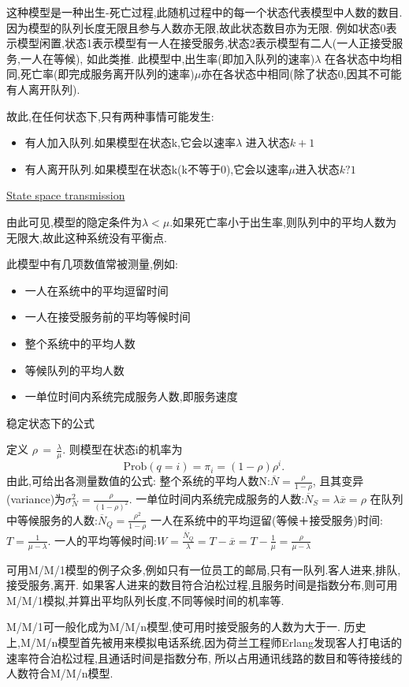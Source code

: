 \documentclass{article}
\begin{document}
这种模型是一种出生-死亡过程,此随机过程中的每一个状态代表模型中人数的数目.因为模型的队列长度无限且参与人数亦无限,故此状态数目亦为无限.
例如状态0表示模型闲置,状态1表示模型有一人在接受服务,状态2表示模型有二人(一人正接受服务,一人在等候),
如此类推. 此模型中,出生率(即加入队列的速率)$\lambda$ 在各状态中均相同,死亡率(即完成服务离开队列的速率)$\mu$亦在各状态中相同(除了状态0,因其不可能有人离开队列).

故此,在任何状态下,只有两种事情可能发生:
\begin{itemize}
\item 有人加入队列.如果模型在状态k,它会以速率$\lambda$ 进入状态$k + 1$
\item 有人离开队列.如果模型在状态k(k不等于0),它会以速率$\mu$进入状态$k ? 1$
\end{itemize}

\href{http://upload.wikimedia.org/wikipedia/commons/thumb/e/e6/MM1\_queue\_state\_space.svg/605px-MM1\_queue\_state\_space.svg.png}{State space transmission}

由此可见,模型的隐定条件为$\lambda < \mu$.如果死亡率小于出生率,则队列中的平均人数为无限大,故此这种系统没有平衡点.

此模型中有几项数值常被测量,例如:
\begin{itemize}
\item 一人在系统中的平均逗留时间
\item 一人在接受服务前的平均等候时间
\item 整个系统中的平均人数
\item 等候队列的平均人数
\item 一单位时间内系统完成服务人数,即服务速度
\end{itemize}

稳定状态下的公式

定义 $\scriptstyle \rho \,=\,{\tfrac  {\lambda }{\mu }}$.
则模型在状态i的机率为
$$ {\mbox{Prob}}(q=i)=\pi _{i}=(1-\rho )\rho ^{i}.\, $$
由此,可给出各测量数值的公式:
整个系统的平均人数N:$\overline N={\frac  {\rho }{1-\rho }}$,
且其变异(variance)为$\sigma _{N}^{2}={\frac  {\rho }{(1-\rho )^{2}}}$.
一单位时间内系统完成服务的人数:$\overline N_{S}=\lambda \overline x=\rho$
在队列中等候服务的人数:$\overline N_{Q}={\frac  {\rho ^{2}}{1-\rho }}$
一人在系统中的平均逗留(等候＋接受服务)时间:$T={\frac  {1}{\mu -\lambda }}$.
一人的平均等候时间:$W={\frac  {\overline N_{Q}}{\lambda }}=T-\overline x=T-{\frac  {1}{\mu }}={\frac  {\rho }{\mu -\lambda }}$

\begin{example}
可用M/M/1模型的例子众多,例如只有一位员工的邮局,只有一队列.客人进来,排队,接受服务,离开.
如果客人进来的数目符合泊松过程,且服务时间是指数分布,则可用M/M/1模拟,并算出平均队列长度,不同等候时间的机率等.

M/M/1可一般化成为M/M/n模型,使可用时接受服务的人数为大于一.
历史上,M/M/n模型首先被用来模拟电话系统,因为荷兰工程师Erlang发现客人打电话的速率符合泊松过程,且通话时间是指数分布,
所以占用通讯线路的数目和等待接线的人数符合M/M/n模型.
\end{example}
\end{document}
